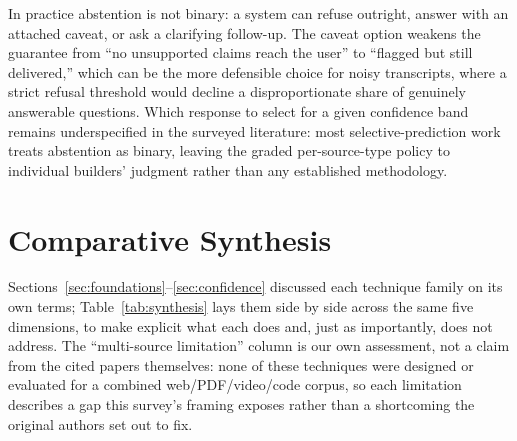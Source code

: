 \documentclass[conference]{IEEEtran}
\begin{document}
In practice abstention is not binary: a system can refuse outright, answer with an attached caveat, or ask a clarifying follow-up. The caveat option weakens the guarantee from ``no unsupported claims reach the user'' to ``flagged but still delivered,'' which can be the more defensible choice for noisy transcripts, where a strict refusal threshold would decline a disproportionate share of genuinely answerable questions. Which response to select for a given confidence band remains underspecified in the surveyed literature: most selective-prediction work \cite{kamath2020selective} treats abstention as binary, leaving the graded per-source-type policy to individual builders' judgment rather than any established methodology.

\section{Comparative Synthesis}
\label{sec:synthesis}

Sections~\ref{sec:foundations}--\ref{sec:confidence} discussed each technique family on its own terms; Table~\ref{tab:synthesis} lays them side by side across the same five dimensions, to make explicit what each does and, just as importantly, does not address. The ``multi-source limitation'' column is our own assessment, not a claim from the cited papers themselves: none of these techniques were designed or evaluated for a combined web/PDF/video/code corpus, so each limitation describes a gap this survey's framing exposes rather than a shortcoming the original authors set out to fix.
\end{document}
